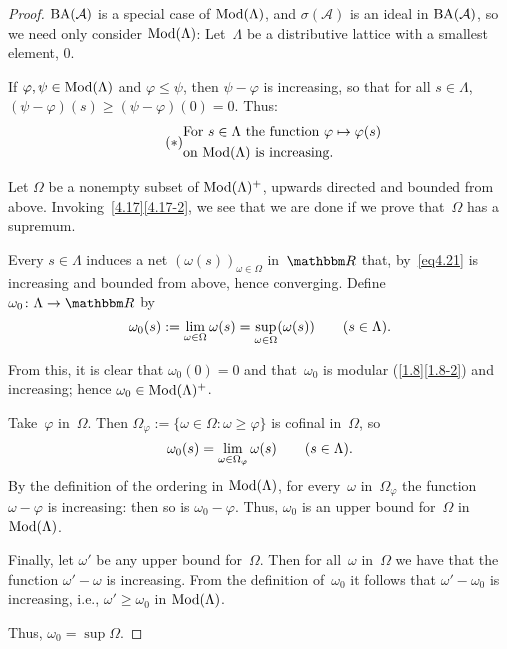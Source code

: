 \documentclass[main.tex]{subfiles}
\begin{document}
\begin{proof}
$\mathrm{BA}(\mathcal A)$ is a special case of $\mathrm{Mod}(\Lambda)$,
and $\sigma(\mathcal A)$ is an ideal in $\mathrm{BA}(\mathcal A)$,
so we need only consider $\mathrm{Mod}(\Lambda)$:
Let~$\Lambda$ be a distributive lattice with a smallest element, $0$.

If $\varphi,\psi\in\mathrm{Mod}(\Lambda)$ and $\varphi\leq\psi$,
then $\psi-\varphi$ is increasing,
so that for all $s\in\Lambda$, 
$(\psi-\varphi)(s)\geq(\psi-\varphi)(0)=0$.
Thus:
\begin{equation}
\label{eq4.21} \tag{$*$}
\begin{alignedat}{2}
&\text{For }s\in\Lambda\text{ the function }\varphi \mapsto \varphi(s) \\
&\text{on }\mathrm{Mod}(\Lambda)\text{ is increasing.}
\end{alignedat}
\end{equation}

Let $\Omega$ be a nonempty subset of $\mathrm{Mod}(\Lambda)^+$,
upwards directed and bounded from above.
Invoking~\ref{4.17}\ref{4.17-2},
we see that we are done if we prove that~$\Omega$ has a supremum.

Every $s\in\Lambda$ induces 
a net $(\omega(s))_{\omega\in\Omega}$ in~$\R$ that,
by~\eqref{eq4.21} is increasing and bounded from above,
hence converging.
Define $\omega_0\colon\Lambda\ra\R$ by
\begin{equation*}
\omega_0(s):=\lim_{\omega\in\Omega}\omega(s)
=\sup_{\omega\in\Omega}(\omega(s))\qquad(s\in \Lambda)\text{.}
\end{equation*}

From this, it is clear that $\omega_0(0)=0$
and that~$\omega_0$ is modular (\ref{1.8}\ref{1.8-2}) and increasing;
hence $\omega_0 \in\mathrm{Mod}(\Lambda)^+$.

Take~$\varphi$ in~$\Omega$.
Then $\Omega_\varphi:=\{\omega\in \Omega\colon \omega\geq \varphi\}$
is cofinal in~$\Omega$, so
\begin{equation*}
\omega_0(s)=\lim_{\omega\in\Omega_\varphi} \omega(s) 
\qquad (s\in\Lambda)\text{.}
\end{equation*}
By the definition of the ordering in $\mathrm{Mod}(\Lambda)$,
for every~$\omega$ in~$\Omega_\varphi$
the function $\omega-\varphi$ is increasing:
then so is $\omega_0-\varphi$.
Thus, $\omega_0$ is an upper bound for~$\Omega$ in $\mathrm{Mod}(\Lambda)$.

Finally,
let $\omega'$ be any upper bound for~$\Omega$.
Then for all~$\omega$ in~$\Omega$ we have 
that the function $\omega'-\omega$ is increasing.
From the definition of~$\omega_0$ it follows that $\omega'-\omega_0$
is increasing, i.e., $\omega'\geq\omega_0$ in $\mathrm{Mod}(\Lambda)$.

Thus, $\omega_0=\sup\Omega$. \xqed
\end{proof}
\clearpage
\emptypage
\end{document}

